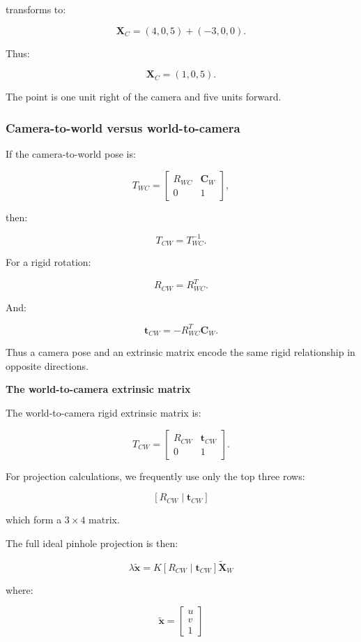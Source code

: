 transforms to:

\[
 \mathbf X_C= (4,0,5)+(-3,0,0).
\]

Thus:

\[
 \boxed{ \mathbf X_C=(1,0,5) }.
\]

The point is one unit right of the camera and five units forward.

\subsubsection{Camera-to-world versus world-to-camera}\label{camera-to-world-versus-world-to-camera}

If the camera-to-world pose is:

\[
 T_{WC}= \begin{bmatrix} R_{WC}&\mathbf C_W\\ 0&1 \end{bmatrix},
\]

then:

\[
 \boxed{ T_{CW}=T_{WC}^{-1} }.
\]

For a rigid rotation:

\[
 R_{CW}=R_{WC}^T.
\]

And:

\[
 \boxed{ \mathbf t_{CW}=-R_{WC}^T\mathbf C_W }.
\]

Thus a camera pose and an extrinsic matrix encode the same rigid relationship in opposite directions.

\textbf{The world-to-camera extrinsic matrix}

The world-to-camera rigid extrinsic matrix is:

\[
 \boxed{ T_{CW}= \begin{bmatrix} R_{CW}&\mathbf t_{CW}\\ 0&1 \end{bmatrix} }.
\]

For projection calculations, we frequently use only the top three rows:

\[
 \boxed{ [R_{CW}\mid\mathbf t_{CW}] }
\]

which form a \(3\times4\) matrix.

The full ideal pinhole projection is then:

\[
 \boxed{ \lambda\tilde{\mathbf x} = K[R_{CW}\mid\mathbf t_{CW}] \tilde{\mathbf X}_W }
\]

where:

\[
 \tilde{\mathbf x}= \begin{bmatrix}u\\v\\1\end{bmatrix}
\]

